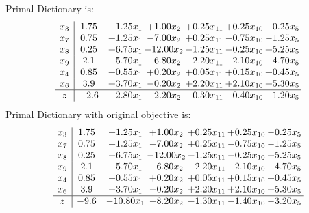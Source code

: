 \documentclass[9pt]{article}
\begin{document}
Primal Dictionary is:
\[\begin{array}{c| c c@{\hskip 2pt} c@{\hskip 2pt} c@{\hskip 2pt} c@{\hskip 2pt} c@{\hskip 2pt} }
 x_{3}   &  1.75 & +  1.25 x_{1} & +  1.00 x_{2} & +  0.25 x_{11} & +  0.25 x_{10} & -0.25 x_{5}\\
 x_{7}   &  0.75 & +  1.25 x_{1} & -7.00 x_{2} & +  0.25 x_{11} & -0.75 x_{10} & -1.25 x_{5}\\
 x_{8}   &  0.25 & +  6.75 x_{1} & -12.00 x_{2} & -1.25 x_{11} & -0.25 x_{10} & +  5.25 x_{5}\\
 x_{9}   &  2.1 & -5.70 x_{1} & -6.80 x_{2} & -2.20 x_{11} & -2.10 x_{10} & +  4.70 x_{5}\\
 x_{4}   &  0.85 & +  0.55 x_{1} & +  0.20 x_{2} & +  0.05 x_{11} & +  0.15 x_{10} & +  0.45 x_{5}\\
 x_{6}   &  3.9 & +  3.70 x_{1} & -0.20 x_{2} & +  2.20 x_{11} & +  2.10 x_{10} & +  5.30 x_{5}\\
\hline
z    &  -2.6 & -2.80 x_{1} & -2.20 x_{2} & -0.30 x_{11} & -0.40 x_{10} & -1.20 x_{5}\\
\end{array}\]
Primal Dictionary with original objective is:
\[\begin{array}{c| c c@{\hskip 2pt} c@{\hskip 2pt} c@{\hskip 2pt} c@{\hskip 2pt} c@{\hskip 2pt} }
 x_{3}   &  1.75 & +  1.25 x_{1} & +  1.00 x_{2} & +  0.25 x_{11} & +  0.25 x_{10} & -0.25 x_{5}\\
 x_{7}   &  0.75 & +  1.25 x_{1} & -7.00 x_{2} & +  0.25 x_{11} & -0.75 x_{10} & -1.25 x_{5}\\
 x_{8}   &  0.25 & +  6.75 x_{1} & -12.00 x_{2} & -1.25 x_{11} & -0.25 x_{10} & +  5.25 x_{5}\\
 x_{9}   &  2.1 & -5.70 x_{1} & -6.80 x_{2} & -2.20 x_{11} & -2.10 x_{10} & +  4.70 x_{5}\\
 x_{4}   &  0.85 & +  0.55 x_{1} & +  0.20 x_{2} & +  0.05 x_{11} & +  0.15 x_{10} & +  0.45 x_{5}\\
 x_{6}   &  3.9 & +  3.70 x_{1} & -0.20 x_{2} & +  2.20 x_{11} & +  2.10 x_{10} & +  5.30 x_{5}\\
\hline
z    &  -9.6 & -10.80 x_{1} & -8.20 x_{2} & -1.30 x_{11} & -1.40 x_{10} & -3.20 x_{5}\\
\end{array}\]
\end{document}
